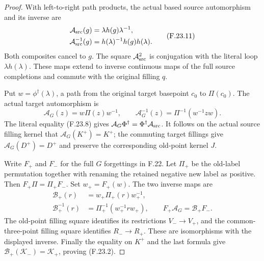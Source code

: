 \begin{proof}
With left-to-right path products, the actual based source
automorphism and its inverse are
\[
 \begin{aligned}
 \mathcal A_{\rm src}(g)&=\lambda h(g)\lambda^{-1},\\
 \mathcal A_{\rm src}^{-1}(g)&=h(\lambda)^{-1}h(g)h(\lambda).
 \end{aligned}                                                \tag{F.23.11}
\]
Both composites cancel to $g$. The square
$\mathcal A_{\rm src}^2$ is conjugation with the literal
loop $\lambda h(\lambda)$.
These maps extend to inverse continuous maps of the full
source completions and commute with the original filling $q$.

Put $w=\phi^\dagger(\lambda)$, a path from the original target
basepoint $c_0$ to $\Pi(c_0)$. The actual target automorphism is
\[
 \mathcal A_G(z)=w\Pi(z)w^{-1},\qquad
 \mathcal A_G^{-1}(z)=\Pi^{-1}(w^{-1}zw).                       \tag{F.23.12}
\]
The literal equality (F.23.8) gives
$\mathcal A_G\Phi^\dagger=\Phi^\dagger\mathcal A_{\rm src}$.
It follows on the actual source filling kernel that
$\mathcal A_G(K^+)=K^+$; the commuting target fillings give
$\mathcal A_G(D^+)=D^+$ and preserve the corresponding old-point
kernel $J$.

Write $F_+$ and $F_-$ for the full $G$ forgettings in F.22.
Let $\Pi_+$ be the old-label permutation together with renaming
the retained negative new label as positive. Then
$F_+\Pi=\Pi_+F_-$. Set $w_+=F_+(w)$. The two inverse maps are
\[
 \begin{aligned}
 \mathcal B_+(r)&=w_+\Pi_+(r)w_+^{-1},\\
 \mathcal B_+^{-1}(r)&=\Pi_+^{-1}(w_+^{-1}rw_+),\qquad
 F_+\mathcal A_G=\mathcal B_+F_- .
 \end{aligned}                                                \tag{F.23.13}
\]
The old-point filling square identifies its restrictions
$V_-\to V_+$, and the common-three-point filling square identifies
$R_-\to R_+$. These are isomorphisms with the displayed inverse.
Finally the equality on $K^+$ and the last formula give
$\mathcal B_+(\mathcal K_-)=\mathcal K_+$, proving (F.23.2).


\end{proof}
